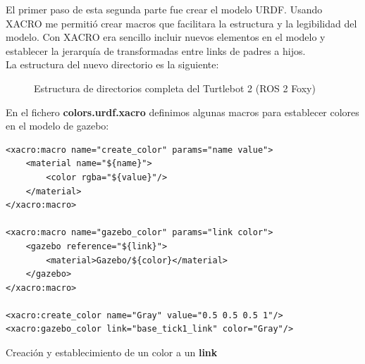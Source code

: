 El primer paso de esta segunda parte fue crear el modelo URDF. Usando XACRO me permitió crear macros que facilitara la estructura y la legibilidad del modelo. Con XACRO era sencillo incluir nuevos elementos en el modelo y establecer la jerarquía de transformadas entre links de padres a hijos.\\

La estructura del nuevo directorio es la siguiente:
\begin{figure}[H]
	\begin{center}
	    \setlength{\fboxsep}{0.5cm}
	    \caption{Estructura de directorios completa del Turtlebot 2 (ROS 2 Foxy)}
	    \label{fig.directorios_turtlebot2}
	\end{center}
\end{figure}

En el fichero \textbf{colors.urdf.xacro} definimos algunas macros para establecer colores en el modelo de gazebo:\\
\begin{code}[H]
\begin{lstlisting}
<xacro:macro name="create_color" params="name value">
	<material name="${name}">
		<color rgba="${value}"/>
	</material>
</xacro:macro>

<xacro:macro name="gazebo_color" params="link color">
	<gazebo reference="${link}">
		<material>Gazebo/${color}</material>
	</gazebo>
</xacro:macro>

<xacro:create_color name="Gray" value="0.5 0.5 0.5 1"/>
<xacro:gazebo_color link="base_tick1_link" color="Gray"/>
\end{lstlisting}
\caption{Creación y establecimiento de un color a un \textbf{link}}
\label{fig:creacion_color_link}
\end{code}

